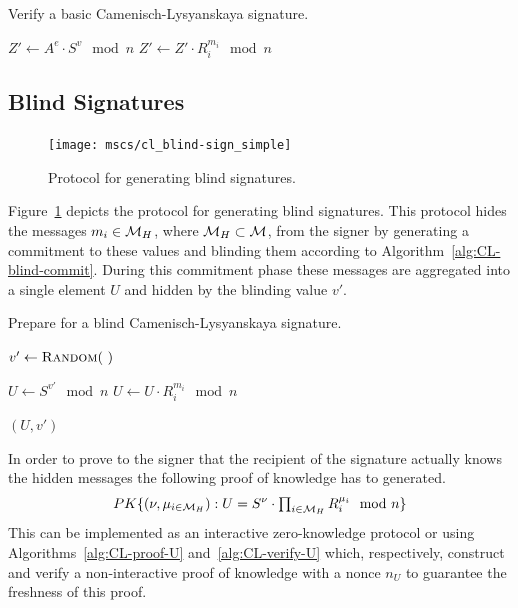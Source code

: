 \begin{algorithm}
  \caption{Verify a basic Camenisch-Lysyanskaya signature.}
  \label{alg:CL-verify}
  \addtolength{\baselineskip}{1mm}
  \begin{algorithmic}[1]
      \State $Z' \gets A^e \cdot S^v \mod n$
        \State $Z' \gets Z' \cdot R_i^{m_i} \mod n$
      \EndFor

        \Return {}
      \EndIf

      \Return {}
    \EndFunction
  \end{algorithmic}
\end{algorithm}

\subsection{Blind Signatures}\label{sec:cl_blind}

\begin{figure}[ht]
  \centering
  \texttt{[image: mscs/cl\_blind-sign\_simple]}
  \caption{Protocol for generating blind signatures.}
  \label{msc:cl_blind-sign}
\end{figure}

Figure~\ref{msc:cl_blind-sign} depicts the protocol for generating blind
signatures. This protocol hides the messages $m_i \in \mathcal{M}_H$, where
$\mathcal{M}_H \subset \mathcal{M}$, from the signer by generating a commitment to these values
and blinding them according to Algorithm~\ref{alg:CL-blind-commit}. During this
commitment phase these messages are aggregated into a single element $U$ and
hidden by the blinding value $v'$.

\begin{algorithm}
  \caption{Prepare for a blind Camenisch-Lysyanskaya signature.}
  \label{alg:CL-blind-commit}
  \addtolength{\baselineskip}{1mm}
  \begin{algorithmic}[1]
      \State $v' \gets \Call{Random}{~}$

      \State $U \gets S^{v'} \mod n$
        \State $U \gets U \cdot R_i^{m_i} \mod n$
      \EndFor

      \Return $(U, v')$
    \EndFunction
  \end{algorithmic}
\end{algorithm}

In order to prove to the signer that the recipient of the signature actually
knows the hidden messages the following proof of knowledge has to generated.
\begin{equation*}
  PK\{(\nu, \mu_{i \in \mathcal{M}_H}) :
    U = S^{\nu} \cdot \textstyle\prod_{i \in \mathcal{M}_H} R_i^{\mu_i} \mod n\}
\end{equation*}
This can be implemented as an interactive zero-knowledge protocol or using
Algorithms~\ref{alg:CL-proof-U} and~\ref{alg:CL-verify-U} which, respectively,
construct and verify a non-interactive proof of knowledge with a nonce $n_U$ to
guarantee the freshness of this proof.

